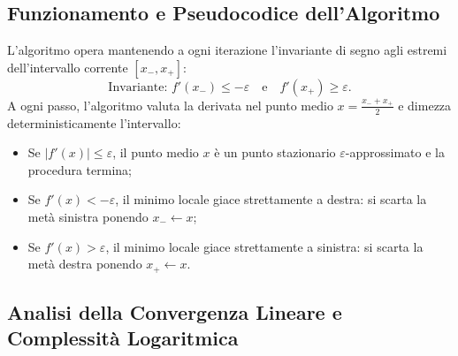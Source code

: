 \subsection{Funzionamento e Pseudocodice dell'Algoritmo}
L'algoritmo opera mantenendo a ogni iterazione l'invariante di segno agli estremi dell'intervallo corrente $[x_-, x_+]$:
\begin{equation}
    \text{Invariante: } f'(x_-) \le -\varepsilon \quad \text{e} \quad f'(x_+) \ge \varepsilon.
\end{equation}
A ogni passo, l'algoritmo valuta la derivata nel punto medio $x = \frac{x_- + x_+}{2}$ e dimezza deterministicamente l'intervallo:
\begin{itemize}
    \item Se $|f'(x)| \le \varepsilon$, il punto medio $x$ \`e un punto stazionario $\varepsilon$-approssimato e la procedura termina;
    \item Se $f'(x) < -\varepsilon$, il minimo locale giace strettamente a destra: si scarta la met\`a sinistra ponendo $x_- \gets x$;
    \item Se $f'(x) > \varepsilon$, il minimo locale giace strettamente a sinistra: si scarta la met\`a destra ponendo $x_+ \gets x$.
\end{itemize}

\begin{algorithm}[H]
\caption{Ricerca Dicotomica per Ottimizzazione Univariata (\texttt{DichotomicSearch})}
\label{alg:ricerca-dicotomica}

\;
\end{algorithm}

\subsection{Analisi della Convergenza Lineare e Complessit\`a Logaritmica}


